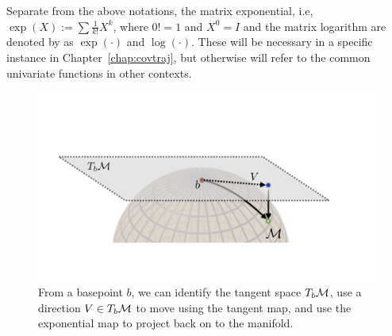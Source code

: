 Separate from the above notations, the matrix exponential, i.e, $\exp(X):= \sum \frac{1}{k!} X^k$, where $0!=1$ and $X^0=I$  and the matrix logarithm are denoted by as $\exp(\cdot)$ and $\log(\cdot)$. These will be necessary in a specific instance in Chapter~\ref{chap:covtraj}, but otherwise will refer
to the common univariate functions in other contexts.
\begin{figure}
	\centering
	\includegraphics[width=\textwidth,trim={0 7cm 5cm 10cm},clip]{2_bknd/manifoldops.pdf}
	\caption[Operations on the Manifold]{From a basepoint $b$, we can identify the tangent space $T_b\mathcal{M}$, use a direction $V\in T_b\mathcal{M}$ to move using the tangent map, and use the exponential map to project back on to the manifold.}
	\label{fig:ot}
\end{figure}

